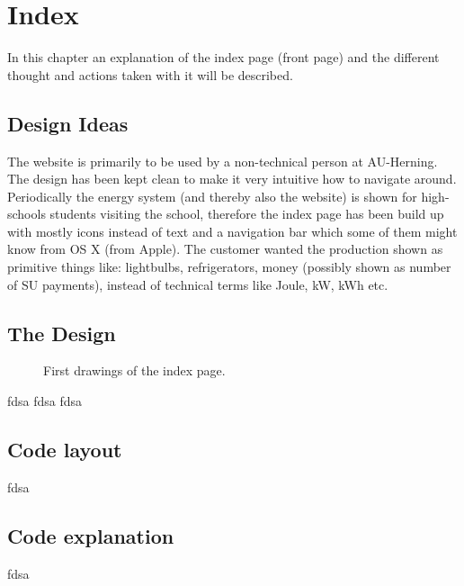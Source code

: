 \newpage
\chapter{Index}
In this chapter an explanation of the index page (front page)  and the different thought and actions taken with it will be described.  
\section{Design Ideas}
The website is primarily to be used by a non-technical person at AU-Herning. The design has been kept clean to make it very intuitive how to navigate around. Periodically the energy system (and thereby also the website) is shown for high-schools students visiting the school, therefore the index page has been build up with mostly icons instead of text and a navigation bar which some of them might know from OS X (from Apple). The customer wanted the production shown as primitive things like: lightbulbs, refrigerators, money (possibly shown as number of SU payments), instead of technical terms like Joule, kW, kWh etc.
\section{The Design}

\begin{figure}[h!]
	\center
		\setlength\fboxsep{0pt}
		\setlength\fboxrule{1pt}
   	\caption{First drawings of the index page.}
   	\label{fig:index_page_design}
\end{figure}
fdsa fdsa fdsa
\section{Code layout}
fdsa
\section{Code explanation}
fdsa
